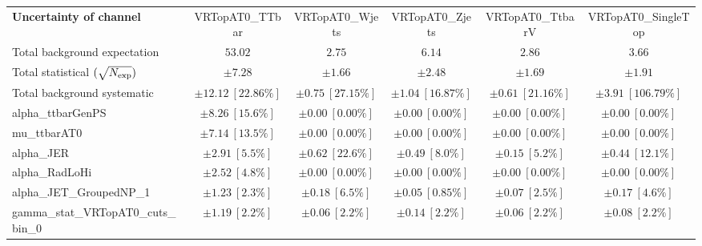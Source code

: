
\begin{sidewaystable}
\begin{center}
\setlength{\tabcolsep}{0.0pc}
\begin{tabular*}{\textwidth}{@{\extracolsep{\fill}}lccccc}
\noalign{\smallskip}\hline\noalign{\smallskip}
{\bf Uncertainty of channel}                                    & VRTopAT0\_TTbar            & VRTopAT0\_Wjets            & VRTopAT0\_Zjets            & VRTopAT0\_TtbarV            & VRTopAT0\_SingleTop            \\
\noalign{\smallskip}\hline\noalign{\smallskip}
Total background expectation             &  $53.02$        &  $2.75$        &  $6.14$        &  $2.86$        &  $3.66$       \\
\noalign{\smallskip}\hline\noalign{\smallskip}
Total statistical $(\sqrt{N_{\rm exp}})$              & $\pm 7.28$        & $\pm 1.66$        & $\pm 2.48$        & $\pm 1.69$        & $\pm 1.91$       \\
Total background systematic               & $\pm 12.12\ [22.86\%] $        & $\pm 0.75\ [27.15\%] $        & $\pm 1.04\ [16.87\%] $        & $\pm 0.61\ [21.16\%] $        & $\pm 3.91\ [106.79\%] $             \\
\noalign{\smallskip}\hline\noalign{\smallskip}
\noalign{\smallskip}\hline\noalign{\smallskip}
alpha\_ttbarGenPS         & $\pm 8.26\ [15.6\%] $          & $\pm 0.00\ [0.00\%] $          & $\pm 0.00\ [0.00\%] $          & $\pm 0.00\ [0.00\%] $          & $\pm 0.00\ [0.00\%] $       \\
mu\_ttbarAT0         & $\pm 7.14\ [13.5\%] $          & $\pm 0.00\ [0.00\%] $          & $\pm 0.00\ [0.00\%] $          & $\pm 0.00\ [0.00\%] $          & $\pm 0.00\ [0.00\%] $       \\
alpha\_JER         & $\pm 2.91\ [5.5\%] $          & $\pm 0.62\ [22.6\%] $          & $\pm 0.49\ [8.0\%] $          & $\pm 0.15\ [5.2\%] $          & $\pm 0.44\ [12.1\%] $       \\
alpha\_RadLoHi         & $\pm 2.52\ [4.8\%] $          & $\pm 0.00\ [0.00\%] $          & $\pm 0.00\ [0.00\%] $          & $\pm 0.00\ [0.00\%] $          & $\pm 0.00\ [0.00\%] $       \\
alpha\_JET\_GroupedNP\_1         & $\pm 1.23\ [2.3\%] $          & $\pm 0.18\ [6.5\%] $          & $\pm 0.05\ [0.85\%] $          & $\pm 0.07\ [2.5\%] $          & $\pm 0.17\ [4.6\%] $       \\
gamma\_stat\_VRTopAT0\_cuts\_bin\_0         & $\pm 1.19\ [2.2\%] $          & $\pm 0.06\ [2.2\%] $          & $\pm 0.14\ [2.2\%] $          & $\pm 0.06\ [2.2\%] $          & $\pm 0.08\ [2.2\%] $       \\

\end{tabular*}
\end{center}
\end{sidewaystable}
